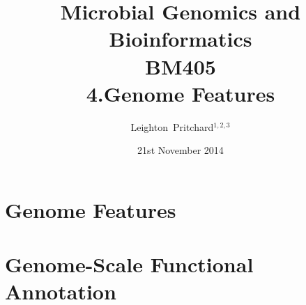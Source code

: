 

%



\title[Microbial Genomics and Bioinformatics: 4.Genome Features] %
{Microbial Genomics and \\ Bioinformatics \\
BM405 \\
4.Genome Features}
\author[Pritchard] %
{Leighton~Pritchard$^{1,2,3}$}
\date[21st November 2014] %
{21st November 2014}
\subject{Bioinformatics, Genomics, Bacteria, Sequencing, Microbiology, Microbes}





\frame[plain]{\titlepage}



\section{Genome Features}





\section{Genome-Scale Functional Annotation}



